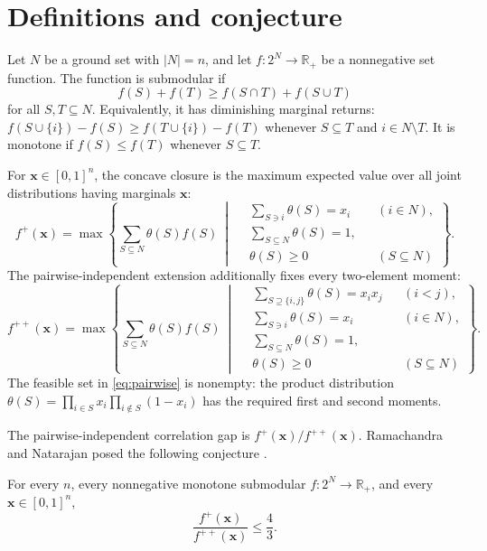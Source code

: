 \section{Definitions and conjecture}

Let $N$ be a ground set with $|N|=n$, and let
$f:2^N\to\mathbb{R}_+$ be a nonnegative set function.  The function is
submodular if
\[
  f(S)+f(T)\geq f(S\cap T)+f(S\cup T)
\]
for all $S,T\subseteq N$.  Equivalently, it has diminishing marginal returns:
$f(S\cup\{i\})-f(S)\geq f(T\cup\{i\})-f(T)$ whenever
$S\subseteq T$ and $i\in N\setminus T$.  It is monotone if
$f(S)\leq f(T)$ whenever $S\subseteq T$.

For $\boldsymbol{x}\in[0,1]^n$, the concave closure is the maximum expected
value over all joint distributions having marginals $\boldsymbol{x}$:
\begin{equation}
\label{eq:unrestricted}
f^+(\boldsymbol{x})=
\max\left\{
\sum_{S\subseteq N}\theta(S)f(S)\ \middle|\
\begin{aligned}
 &\sum_{S\ni i}\theta(S)=x_i &&(i\in N),\\
 &\sum_{S\subseteq N}\theta(S)=1,\\
 &\theta(S)\geq0 &&(S\subseteq N)
\end{aligned}
\right\}.
\end{equation}
The pairwise-independent extension additionally fixes every two-element
moment:
\begin{equation}
\label{eq:pairwise}
f^{++}(\boldsymbol{x})=
\max\left\{
\sum_{S\subseteq N}\theta(S)f(S)\ \middle|\
\begin{aligned}
 &\sum_{S\supseteq\{i,j\}}\theta(S)=x_i x_j &&(i<j),\\
 &\sum_{S\ni i}\theta(S)=x_i &&(i\in N),\\
 &\sum_{S\subseteq N}\theta(S)=1,\\
 &\theta(S)\geq0 &&(S\subseteq N)
\end{aligned}
\right\}.
\end{equation}
The feasible set in \eqref{eq:pairwise} is nonempty: the product distribution
$\theta(S)=\prod_{i\in S}x_i\prod_{i\notin S}(1-x_i)$ has the required first
and second moments.

The pairwise-independent correlation gap is
$f^+(\boldsymbol{x})/f^{++}(\boldsymbol{x})$.  Ramachandra and Natarajan
posed the following conjecture \cite{ramachandra2025}.

\begin{conjecture}
For every $n$, every nonnegative monotone submodular
$f:2^N\to\mathbb{R}_+$, and every $\boldsymbol{x}\in[0,1]^n$,
\[
  \frac{f^+(\boldsymbol{x})}{f^{++}(\boldsymbol{x})}\leq\frac43.
\]
\end{conjecture}
